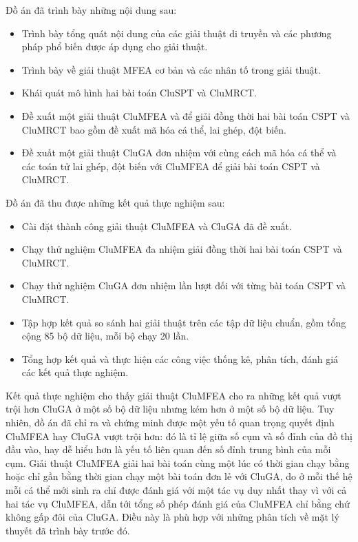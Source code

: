 Đồ án đã trình bày những nội dung sau:
\begin{itemize}
	\item Trình bày tổng quát nội dung của các giải thuật di truyền và các phương pháp phổ biến được áp dụng cho giải thuật.
	\item Trình bày về giải thuật MFEA cơ bản và các nhân tố trong giải thuật.
	\item Khái quát mô hình hai bài toán CluSPT và CluMRCT.
	\item Đề xuất một giải thuật CluMFEA và để giải đồng thời hai bài toán CSPT và CluMRCT bao gồm đề xuất mã hóa cá thể, lai ghép, đột biến.
	\item Đề xuất một giải thuật CluGA đơn nhiệm với cùng cách mã hóa cá thể và các toán tử lai ghép, đột biến với CluMFEA để giải bài toán CSPT và CluMRCT.
\end{itemize}
Đồ án đã thu được những kết quả thực nghiệm sau:
\begin{itemize}
	\item Cài đặt thành công giải thuật CluMFEA và CluGA đã đề xuất.
	\item Chạy thử nghiệm CluMFEA đa nhiệm giải đồng thời hai bài toán CSPT và CluMRCT.
	\item Chạy thử nghiệm CluGA đơn nhiệm lần lượt đối với từng bài toán CSPT và CluMRCT. 
	\item Tập hợp kết quả so sánh hai giải thuật trên các tập dữ liệu chuẩn, gồm tổng cộng 85 bộ dữ liệu, mỗi bộ chạy 20 lần.
	\item Tổng hợp kết quả và thực hiện các công việc thống kê, phân tích, đánh giá các kết quả thực nghiệm.
\end{itemize}

Kết quả thực nghiệm cho thấy giải thuật CluMFEA cho ra những kết quả vượt trội hơn CluGA ở một số bộ dữ liệu nhưng kém hơn ở một số bộ dữ liệu. Tuy nhiên, đồ án đã chỉ ra và chứng minh được một yếu tố quan trọng quyết định CluMFEA hay CluGA vượt trội hơn: đó là tỉ lệ giữa số cụm và số đỉnh của đồ thị đầu vào, hay dễ hiểu hơn là yếu tố liên quan đến số đỉnh trung bình của mỗi cụm. Giải thuật CluMFEA giải hai bài toán cùng một lúc có thời gian chạy bằng hoặc chỉ gần bằng thời gian chạy một bài toán đơn lẻ với CluGA, do ở mỗi thế hệ mỗi cá thể mới sinh ra chỉ được đánh giá với một tác vụ duy nhất thay vì với cả hai tác vụ CluMFEA, dẫn tới tổng số phép đánh giá của CluMFEA chỉ bằng chứ không gấp đôi của CluGA. Điều này là phù hợp với những phân tích về mặt lý thuyết đã trình bày trước đó.

